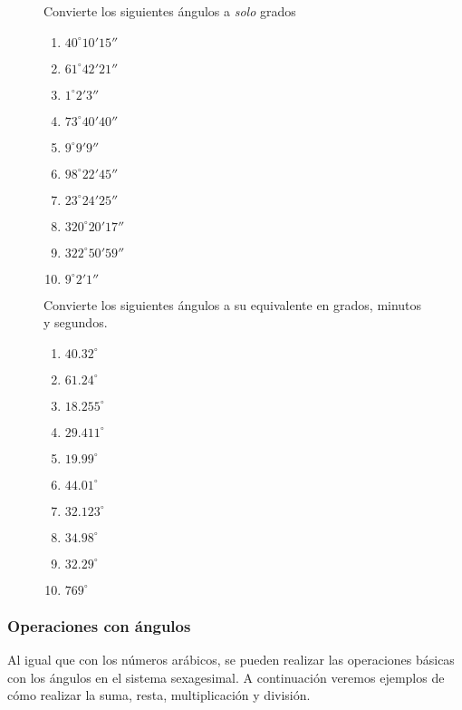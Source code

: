 \begin{figure*}[h!]
 \begin{kaoexercises}
 Convierte los siguientes ángulos a \textit{solo} grados
 \begin{multicols}{4}
		\begin{enumerate}
		\setlength\itemsep{4mm}
		\item $40^\circ 10' 15''$
		\item $61^\circ 42' 21''$
		\item $1^\circ 2' 3''$
		\item $73^\circ 40' 40''$
		\item $9^\circ 9' 9''$
		\item $98^\circ 22' 45''$
		\item $23^\circ 24' 25''$
		\item $320^\circ 20' 17''$
		\item $322^\circ 50' 59''$
		\item $9^\circ 2' 1''$
	\end{enumerate}
 \end{multicols}

 Convierte los siguientes ángulos a su equivalente en grados, minutos y segundos.
 \begin{multicols}{4}
		\begin{enumerate}
		\setlength\itemsep{4mm}
		\item $40.32^\circ$
		\item $61.24^\circ$
		\item $18.255^\circ$
		\item $29.411^\circ$
		\item $19.99^\circ$
		\item $44.01^\circ$
		\item $32.123^\circ$
		\item $34.98^\circ$
		\item $32.29^\circ$
		\item $769^\circ$
	\end{enumerate}
 \end{multicols}

 \end{kaoexercises}
\end{figure*}

\subsubsection{Operaciones con ángulos}

Al igual que con los números arábicos, se pueden realizar las operaciones 
básicas con los ángulos en el sistema sexagesimal. A continuación veremos 
ejemplos de cómo realizar la suma, resta, multiplicación y división.\\

